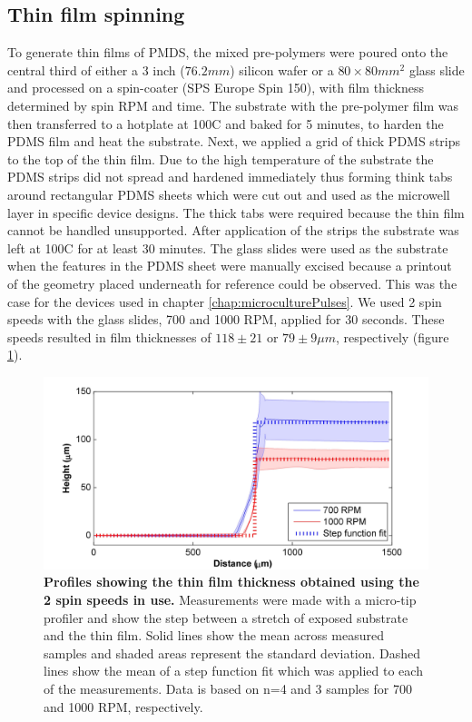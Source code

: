         \subsection{Thin film spinning}
        To generate thin films of PMDS, the mixed pre-polymers were poured onto the central third of either a 3 inch (\(76.2mm\)) silicon wafer or a \(80\times 80 mm^{2}\) glass slide and processed on a spin-coater (SPS Europe Spin 150), with film thickness determined by spin RPM and time. The substrate with the pre-polymer film was then transferred to a hotplate at 100\degree C and baked for 5 minutes, to harden the PDMS film and heat the substrate. Next, we applied a grid of thick PDMS strips to the top of the thin film. Due to the high temperature of the substrate the PDMS strips did not spread and hardened immediately thus forming think tabs around rectangular PDMS sheets which were cut out and used as the microwell layer in specific device designs. The thick tabs were required because the thin film cannot be handled unsupported. After application of the strips the substrate was left at 100\degree C for at least 30 minutes. The glass slides were used as the substrate when the features in the PDMS sheet were manually excised because a printout of the geometry placed underneath for reference could be observed. This was the case for the devices used in chapter \ref{chap:microculturePulses}. We used 2 spin speeds with the glass slides, 700 and 1000 RPM, applied for 30 seconds. These speeds resulted in film thicknesses of \(118\pm 21\) or \(79\pm 9\mu m\), respectively (figure \ref{fig:methods:profiles}).
        \begin{figure}[h]
            \includegraphics[width=14cm]{chapter2/figures/profiles/spin_profiles.jpg}
            
            \caption[Profiling of PDMS thin film thicknesses]{\textbf{Profiles showing the thin film thickness obtained using the 2 spin speeds in use.} Measurements were made with a micro-tip profiler and show the step between a stretch of exposed substrate and the thin film. Solid lines show the mean across measured samples and shaded areas represent the standard deviation. Dashed lines show the mean of a step function fit which was applied to each of the measurements. Data is based on n=4 and 3 samples for 700 and 1000 RPM, respectively.}
            \label{fig:methods:profiles}
        \end{figure}
